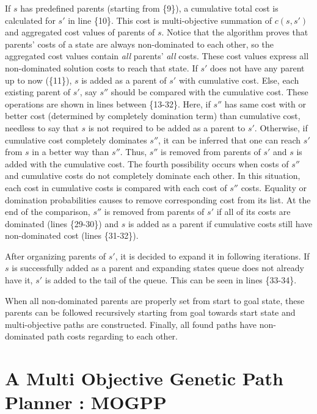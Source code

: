 \documentclass[10pt,journal]{IEEEtran}
\begin{document}
If $s$ has predefined parents (starting from \{9\}), a cumulative total cost is calculated for $s'$ in line \{10\}. This cost is multi-objective summation of $c(s, s')$ and aggregated cost values of parents of $s$. Notice that the algorithm proves that parents' costs of a state are always non-dominated to each other, so the aggregated cost values contain \textit{all} parents' \textit{all} costs. These cost values express all non-dominated solution costs to reach that state. If $s'$ does not have any parent up to now (\{11\}), $s$ is added as a parent of $s'$ with cumulative cost. Else, each existing parent of $s'$, say $s''$ should be compared with the cumulative cost. These operations are shown in lines between \{13-32\}. Here, if $s''$ has same cost with or better cost (determined by completely domination term) than cumulative cost, needless to say that $s$ is not required to be added as a parent to $s'$. Otherwise, if cumulative cost completely dominates $s''$, it can be inferred that one can reach $s'$ from $s$ in a better way than $s''$. Thus, $s''$ is removed from parents of $s'$ and $s$ is added with the cumulative cost. The fourth possibility occurs when costs of $s''$ and cumulative costs do not completely dominate each other. In this situation, each cost in cumulative costs is compared with each cost of $s''$ costs. Equality or domination probabilities causes to remove corresponding cost from its list. At the end of the comparison, $s''$ is removed from parents of $s'$ if all of its costs are dominated (lines \{29-30\}) and $s$ is added as a parent if cumulative costs still have non-dominated cost (lines \{31-32\}).

After organizing parents of $s'$, it is decided to expand it in following iterations. If $s$ is successfully added as a parent and expanding states queue does not already have it, $s'$ is added to the tail of the queue. This can be seen in lines \{33-34\}.

When all non-dominated parents are properly set from start to goal state, these parents can be followed recursively starting from goal towards start state and multi-objective paths are constructed. Finally, all found paths have non-dominated path costs regarding to each other.

\section{A Multi Objective Genetic Path Planner : MOGPP}

\end{document}
